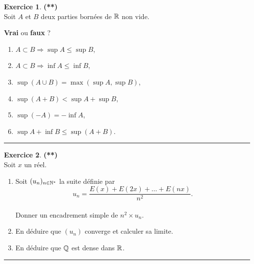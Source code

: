 \documentclass[a4paper,11pt]{article}
\theoremstyle{definition}
\newtheorem{exo}{Exercice} %
\begin{document}
\begin{minipage}{1\linewidth}
\begin{minipage}[c]{0.48\linewidth}
		
	\end{minipage}	
	\hfill\vrule\hfill
	\begin{minipage}[c]{0.48\linewidth}
		\raggedright
		
		
		
		\begin{exo}\textbf{(**)}\quad\\[0.2cm]
			Soit $A$ et $B$ deux parties born\'ees de $\mathbb{R}$ non vide.
			
			\textbf{Vrai} ou \textbf{faux} ?
			\begin{enumerate}
				\item  $A \subset B \Rightarrow \sup A \leqslant \sup B$,
				\item $A \subset B \Rightarrow \inf A \leqslant \inf B$,
				\item $\sup (A\cup B) = \max(\sup A,\sup B)$,
				\item $\sup(A+B) < \sup A + \sup B$,
				\item $\sup(-A) = -\inf A$,
				\item $\sup A +\inf B \leqslant \sup(A+B)$.
			\end{enumerate}
			
			\centering
			\rule{1\linewidth}{0.6pt}
		\end{exo}
		
		
		\begin{exo}\textbf{(**)}\quad\\[0.2cm]
			Soit $x$ un r\'eel.
			\begin{enumerate}
				\item Soit $(u_n)_{n\in \mathbb{N}^*}$ la suite définie par $$u_n = \dfrac{E (x) + E (2x) + \ldots + E (nx)}{n^2}.$$ \\
				Donner un encadrement simple de $n^2 \times u_n$.
				\item En déduire que $(u_n)$ converge et calculer sa limite.
				\item En d\'eduire que $\mathbb{Q}$ est dense dans $\mathbb{R}$.
			\end{enumerate}
			
			\centering
			\rule{1\linewidth}{0.6pt}
		\end{exo}
		
		
		
	\end{minipage}
\end{minipage}


	
\end{document}
